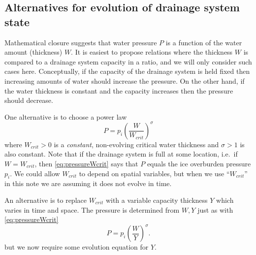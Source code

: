 \documentclass[11pt]{amsart}
\begin{document}
\subsection*{Alternatives for evolution of drainage system state}  Mathematical closure suggests that water pressure $P$ is a function of the water amount (thickness) $W$.  It is easiest to propose relations where the thickness $W$ is compared to a drainage system capacity in a ratio, and we will only consider such cases here.  Conceptually, if the capacity of the drainage system is held fixed then increasing amounts of water should increase the pressure.  On the other hand, if the water thickness is constant and the capacity increases then the pressure should decrease.  

One alternative is to choose a power law
\begin{equation} \label{eq:pressureWcrit}
P = p_i \left(\frac{W}{W_{crit}}\right)^\sigma
\end{equation}
where $W_{crit}>0$ is a \emph{constant}, non-evolving critical water thickness and $\sigma>1$ is also constant.  Note that if the drainage system is full at some location, i.e.~if $W=W_{crit}$, then \eqref{eq:pressureWcrit} says that $P$ equals the ice overburden pressure $p_i$.  We could allow $W_{crit}$ to depend on spatial variables, but when we use ``$W_{crit}$'' in this note we are assuming it does not evolve in time.

An alternative is to replace $W_{crit}$ with a variable capacity thickness $Y$ which varies in time and space.  The pressure is determined from $W,Y$ just as with \eqref{eq:pressureWcrit}
\begin{equation} \label{eq:pressureY}
P = p_i \left( \frac{W}{Y} \right)^\sigma.
\end{equation}
but we now require some evolution equation for $Y$.
\end{document}
